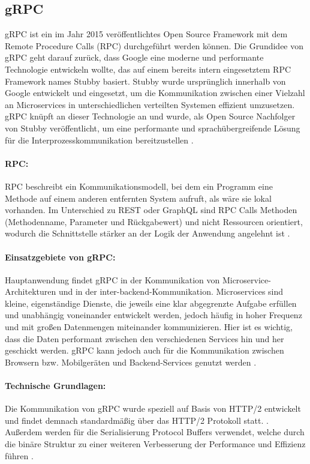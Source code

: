 \clearpage
\subsection{gRPC}
gRPC ist ein im Jahr 2015 veröffentlichtes Open Source Framework mit dem Remote Procedure Calls (RPC) durchgeführt werden können. Die Grundidee von gRPC geht darauf zurück, dass Google eine moderne und performante Technologie entwickeln wollte, das auf einem bereits intern eingesetztem RPC Framework names Stubby basiert. 
Stubby wurde ursprünglich innerhalb von Google entwickelt und eingesetzt, um die Kommunikation zwischen einer Vielzahl an Microservices in unterschiedlichen verteilten Systemen effizient umzusetzen. gRPC knüpft an dieser Technologie an und wurde, als Open Source Nachfolger von Stubby veröffentlicht, um eine performante und sprachübergreifende Lösung für die Interprozesskommunikation bereitzustellen \parencite{gRPCAbout}.


\paragraph{RPC:}
RPC beschreibt ein Kommunikationsmodell, bei dem ein Programm eine Methode auf einem anderen entfernten System aufruft, als wäre sie lokal vorhanden. Im Unterschied zu REST oder GraphQL sind RPC Calls Methoden (Methodenname, Parameter und Rückgabewert) und nicht Ressourcen orientiert, wodurch die Schnittstelle stärker an der Logik der Anwendung angelehnt ist \parencite{aws-rpc-vs-rest}.

\paragraph{Einsatzgebiete von gRPC:} Hauptanwendung findet gRPC in der Kommunikation von Microservice-Architekturen und in der inter-backend-Kommunikation. Microservices sind kleine, eigenständige Dienste, die jeweils eine klar abgegrenzte Aufgabe erfüllen und unabhängig voneinander entwickelt werden, jedoch häufig in hoher Frequenz und mit großen Datenmengen miteinander kommunizieren. Hier ist es wichtig, dass die Daten performant zwischen den verschiedenen Services hin und her geschickt werden. gRPC kann jedoch auch für die Kommunikation zwischen Browsern bzw. Mobilgeräten und Backend-Services genutzt werden \parencite{gRPCAbout}.

\paragraph{Technische Grundlagen:} Die Kommunikation von gRPC wurde speziell auf Basis von HTTP/2 entwickelt und findet demnach standardmäßig über das HTTP/2 Protokoll statt. \parencite{grpc-googleblog}. Außerdem werden für die Serialisierung Protocol Buffers verwendet, welche durch die binäre Struktur zu einer weiteren Verbesserung der Performance und Effizienz führen \parencite{protobufdocs}.

